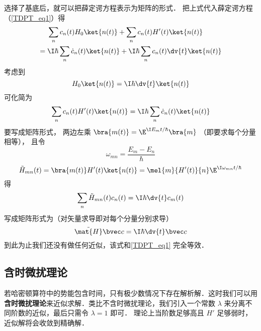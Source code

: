 选择了基底后，就可以把薛定谔方程表示为矩阵的形式． %
把上式代入薛定谔方程（\autoref{TDPT_eq1}）得
\begin{equation}
\begin{aligned}
&\sum_n c_n(t) H_0 \ket{n(t)} + \sum_n c_n(t) H'(t) \ket{n(t)} \\ 
={} &\I\hbar \sum_n \dot c_n(t) \ket{n(t)}
+ \I\hbar \sum_n c_n(t) \dv{t} \ket{n(t)}
\end{aligned}
\end{equation}
考虑到
\begin{equation}
H_0\ket{n(t)} = \I\hbar \dv{t} \ket{n(t)}
\end{equation}
可化简为
\begin{equation}\label{TDPT_eq11}
\sum_n c_n(t) H'(t) \ket{n(t)}
= \I\hbar \sum_n \dot c_n(t) \ket{n(t)}
\end{equation}
要写成矩阵形式， 两边左乘 $\bra{m(t)} = \E^{\I E_m t/\hbar}\bra{m}$ （即要求每个分量相等）， 且令
\begin{equation}
\omega_{mn} = \frac{E_m-E_n}{\hbar}
\end{equation}
\begin{equation}\label{TDPT_eq7}
\tilde H_{mn}(t) = \bra{m(t)} H'(t) \ket{n(t)} = \mel{m}{H'(t)}{n} \E^{\I\omega_{mn}t/\hbar}
\end{equation}
得
\begin{equation}\label{TDPT_eq2}
\sum_n \tilde H_{mn}(t) c_n(t)
= \I\hbar \dv{t} c_m(t)
\end{equation}
写成矩阵形式为（对矢量求导即对每个分量分别求导）
\begin{equation}\label{TDPT_eq3}
\tilde{\mat {H}} \bvec c = \I\hbar \dv{t} \bvec c
\end{equation}
到此为止我们还没有做任何近似，该式和\autoref{TDPT_eq1} 完全等效．

\subsection{含时微扰理论}

若哈密顿算符中的势能包含时间，只有极少数情况下存在解析解．这时我们可以用\textbf{含时微扰理论}来近似求解．类比不含时微扰理论，我们引入一个常数 $\lambda$ 来分离不同阶数的近似，最后只需令 $\lambda = 1$ 即可． 理论上当阶数足够高且 $H'$ 足够弱时，近似解将会收敛到精确解．

